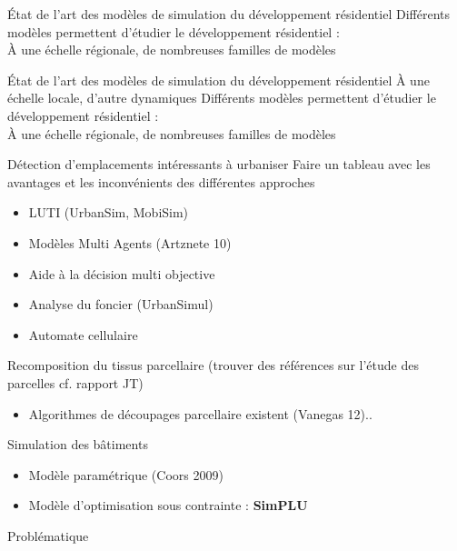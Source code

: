 \documentclass[xcolor=table]{beamer}
\begin{document}
\begin{frame}{État de l'art des modèles de simulation du développement résidentiel}
	Différents modèles permettent d'étudier le développement résidentiel :
	\\
	À une échelle régionale, de nombreuses familles de modèles
\end{frame}

\begin{frame}{État de l'art des modèles de simulation du développement résidentiel}
À une échelle locale, d'autre dynamiques
Différents modèles permettent d'étudier le développement résidentiel :
\\
À une échelle régionale, de nombreuses familles de modèles
\end{frame}

\begin{frame}{Détection d'emplacements intéressants à urbaniser}
Faire un tableau avec les avantages et les inconvénients des différentes approches
	\begin{itemize}
		\item LUTI (UrbanSim, MobiSim)
		\item Modèles Multi Agents (Artznete 10)
		\item Aide à la décision multi objective
		\item Analyse du foncier (UrbanSimul)
		\item Automate cellulaire
	\end{itemize}
\end{frame}

\begin{frame}{Recomposition du tissus parcellaire}
	(trouver des références sur l'étude des parcelles cf. rapport JT)
	\begin{itemize}
		\item Algorithmes de découpages parcellaire	existent (Vanegas 12).. 
	\end{itemize}
\end{frame}

\begin{frame}{Simulation des bâtiments}
	\begin{itemize}
		\item Modèle paramétrique (Coors 2009)
		\item Modèle d'optimisation sous contrainte	: \textbf{SimPLU}
	\end{itemize}
\end{frame}

\begin{frame}{Problématique}
\end{frame}
\end{document}
